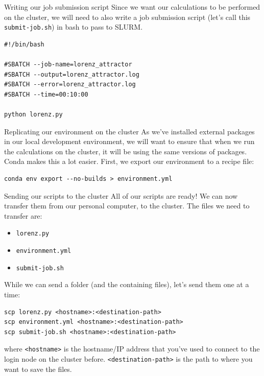 \documentclass[10pt]{beamer}
\begin{document}
\begin{frame}[label={sec:orgbaf9127},fragile]{Writing our job submission script}
 Since we want our calculations to be performed on the cluster, we will need to
also write a job submission script (let's call this \texttt{submit-job.sh}) in bash to
pass to SLURM.

\begin{verbatim}
#!/bin/bash

#SBATCH --job-name=lorenz_attractor
#SBATCH --output=lorenz_attractor.log
#SBATCH --error=lorenz_attractor.log
#SBATCH --time=00:10:00

python lorenz.py
\end{verbatim}
\end{frame}

\begin{frame}[label={sec:org53e385f},fragile]{Replicating our environment on the cluster}
 As we've installed external packages in our local development environment, we
will want to ensure that when we run the calculations on the cluster, it will be
using the same versions of packages. Conda makes this a lot easier. First, we
export our environment to a recipe file:

\begin{verbatim}
conda env export --no-builds > environment.yml
\end{verbatim}
\end{frame}

\begin{frame}[label={sec:orgcd56b64},fragile]{Sending our scripts to the cluster}
 All of our scripts are ready! We can now transfer them from our personal
computer, to the cluster. The files we need to transfer are:

\begin{itemize}
\item \texttt{lorenz.py}
\item \texttt{environment.yml}
\item \texttt{submit-job.sh}
\end{itemize}

While we can send a folder (and the containing files), let's send them one at a time:

\begin{verbatim}
scp lorenz.py <hostname>:<destination-path>
scp environment.yml <hostname>:<destination-path>
scp submit-job.sh <hostname>:<destination-path>
\end{verbatim}

where \texttt{<hostname>} is the hostname/IP address that you've used to connect to the
login node on the cluster before. \texttt{<destination-path>} is the path to where you
want to save the files.
\end{frame}
\end{document}
